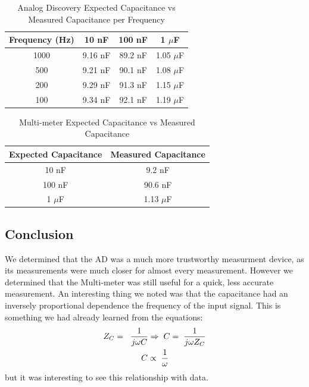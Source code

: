 \documentclass{article}
\begin{document}
\begin{table}[h!]
    \centering
    \begin{tabular}{|c|c|c|c|}
        \hline
        Frequency (Hz) & 10 nF & 100 nF & 1 $\mu$F\\
        \hline
        1000 & 9.16 nF & 89.2 nF & 1.05 $\mu$F\\
        \hline
        500 & 9.21 nF & 90.1 nF & 1.08 $\mu$F\\
        \hline
        200 & 9.29 nF & 91.3 nF & 1.15 $\mu$F\\
        \hline
        100 & 9.34 nF & 92.1 nF & 1.19 $\mu$F\\
        \hline
    \end{tabular}
    \caption{Analog Discovery Expected Capacitance vs Measured Capacitance per Frequency}
    \label{tab:AD Capacitance Measurements}
\end{table}
\begin{table}[h!]
    \centering
    \begin{tabular}{|c|c|}
        \hline
        Expected Capacitance & Measured Capacitance\\
        \hline
        10 nF & 9.2 nF\\
        \hline
        100 nF & 90.6 nF\\
        \hline
        1 $\mu$F & 1.13 $\mu$F\\
        \hline
    \end{tabular}
    \caption{Multi-meter Expected Capacitance vs Measured Capacitance}
    \label{tab:MM Capacitance Measurements}
\end{table}
\subsection{Conclusion}
We determined that the AD was a much more trustworthy measurment device, as its measurements were much closer for almost every measurement. However we determined that the Multi-meter was still useful for a quick, less accurate measurement. An interesting thing we noted was that the capacitance had an inversely proportional dependence the frequency of the input signal. This is something we had already learned from the equations:
\begin{align}
    Z_C = \hspace*{1mm}\hspace*{1mm}\frac{1}{j\omega C}\Rightarrow&\hspace*{2mm}
    C = \hspace*{1mm}\frac{1}{j\omega Z_C}\\
    C \propto \hspace*{1mm}&\hspace*{1mm}\frac{1}{\omega}
    \label{eq:Impedance of a Capacitor}
\end{align}
but it was interesting to see this relationship with data.
\end{document}
